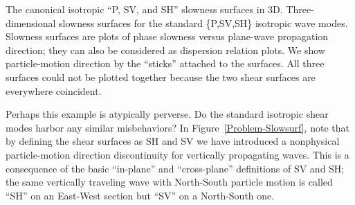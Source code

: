 {The canonical isotropic ``P, SV, and SH'' slowness surfaces in 3D.}
{
Three-dimensional slowness surfaces for the standard \{P,SV,SH\}
isotropic wave modes. Slowness surfaces are plots of phase slowness
versus plane-wave propagation direction; they can also be considered as
dispersion relation plots.
We show particle-motion direction by the ``sticks'' attached to
the surfaces.
All three surfaces could not be plotted together because the two
shear surfaces are everywhere coincident.
}

Perhaps this example is atypically perverse.
Do the standard isotropic shear modes harbor any similar misbehaviors?
In Figure~\ref{Problem-Slowsurf},
note that by defining the shear surfaces as SH and SV
we have introduced a nonphysical particle-motion direction
discontinuity for vertically propagating waves.
This is a consequence of the basic ``in-plane'' and ``cross-plane''
definitions of SV and SH;
the same vertically traveling wave with North-South particle motion
is called ``SH'' on an East-West section
but ``SV'' on a North-South one.
